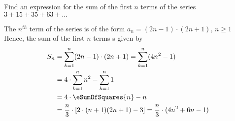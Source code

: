 
%
%
%
%
% 
% 

\question[3] Find an expression for the sum of the first $n$ terms of the series 
$ 3 + 15 + 35 + 63 + \ldots $

\ifprintanswers
\fi 

\begin{solution}[\halfpage]
	The $n^{th}$ term of the series is of the form $a_n = (2n-1)\cdot(2n+1),\, n \geq 1$
	Hence, the sum of the first $n$ terms s given by
	\begin{align}
		S_n &= \sum_{k=1}^{n}(2n-1)\cdot(2n+1) = \sum_{k=1}^{n}(4n^2-1) \\
		&= 4\cdot\sum_{k=1}^{n}n^2 - \sum_{k=1}^{n}1 \\
		&= 4\cdot\eSumOfSquares{n} - n \\
		&= \dfrac{n}{3}\cdot\left[ 2\cdot(n+1)(2n+1) - 3\right] = \dfrac{n}{3}\cdot(4n^2+6n-1)
	\end{align}
\end{solution}
